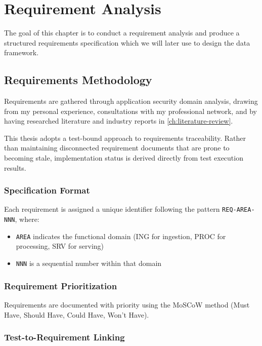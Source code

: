 \chapter{Requirement Analysis}
\label{ch:requirement-analysis}

The goal of this chapter is to conduct a requirement analysis and produce a structured requirements specification which we will later use to design the data framework.


\section{Requirements Methodology}

Requirements are gathered through application security domain analysis, drawing from my personal experience, consultations with my professional network, and by having researched literature and industry reports in \autoref{ch:literature-review}.

This thesis adopts a test-bound approach to requirements traceability. Rather than maintaining disconnected requirement documents that are prone to becoming stale, implementation status is derived directly from test execution results.

\subsection{Specification Format}

Each requirement is assigned a unique identifier following the pattern \texttt{REQ-AREA-NNN}, where:
\begin{itemize}
    \item \texttt{AREA} indicates the functional domain (ING for ingestion, PROC for processing, SRV for serving)
    \item \texttt{NNN} is a sequential number within that domain
\end{itemize}

\subsection{Requirement Prioritization}

Requirements are documented with priority using the MoSCoW method (Must Have, Should Have, Could Have, Won't Have).

\subsection{Test-to-Requirement Linking}

